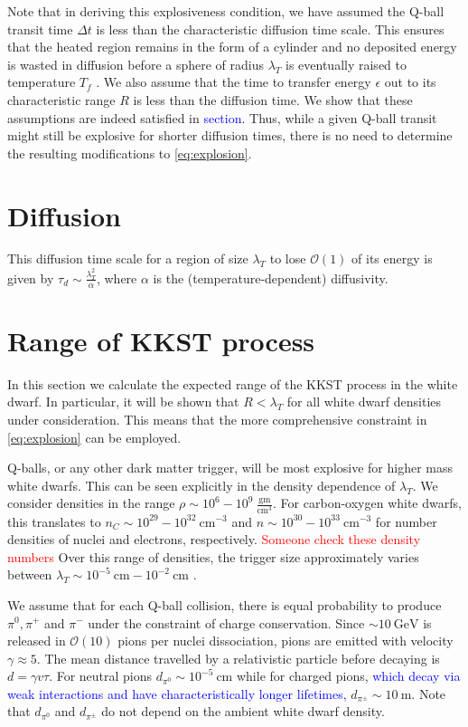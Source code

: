 \documentclass[11 pt, preprint,preprintnumbers,amsmath,amssymb, prd]{revtex4}
\newcommand{\OO}{\mathcal{O}}
\begin{document}
Note that in deriving this explosiveness condition, we have assumed the Q-ball transit time $\Delta t$ is less than the characteristic diffusion time scale. This ensures that the heated region remains in the form of a cylinder and no deposited energy is wasted in diffusion before a sphere of radius $\lambda_T$ is eventually raised to temperature $T_f$ . We also assume that the time to transfer energy $\epsilon$ out to its characteristic range $R$ is less than the diffusion time. We show that these assumptions are indeed satisfied in \textcolor{blue}{section}. Thus, while a given Q-ball transit might still be explosive for shorter diffusion times, there is no need to determine the resulting modifications to \eqref{eq:explosion}. 

\section{Diffusion}
This diffusion time scale for a region of size $\lambda_T$ to lose $\OO(1)$ of its energy is given by $\tau_d \sim \frac{\lambda_T^2}{\alpha}$, where $\alpha$ is the (temperature-dependent) diffusivity. 

\section{Range of KKST process}

In this section we calculate the expected range of the KKST process in the white dwarf. In particular, it will be shown that $R < \lambda_T$ for all white dwarf densities under consideration. This means that the more comprehensive constraint in \eqref{eq:explosion} can be employed. 

Q-balls, or any other dark matter trigger, will be most explosive for higher mass white dwarfs. This can be seen explicitly in the density dependence of $\lambda_T$. We consider densities in the range $\rho \sim 10^{6} - 10^{9} ~\frac{\text{gm}}{\text{cm}^3}$. For carbon-oxygen white dwarfs, this translates to $n_C \sim 10^{29} - 10^{32} ~\text{cm}^{-3}$ and $n \sim 10^{30} - 10^{33} ~\text{cm}^{-3}$ for number densities of nuclei and electrons, respectively. \textcolor{red}{Someone check these density numbers} Over this range of densities, the trigger size approximately varies between $\lambda_T \sim 10^{-5} ~\text{cm} -10^{-2} ~\text{cm}$ \cite{Varela}. 

We assume that for each Q-ball collision, there is equal probability to produce $\pi^0, \pi^+$ and $\pi^-$ under the constraint of charge conservation. Since $\sim 10 ~\text{GeV}$ is released in $\OO(10)$ pions per nuclei dissociation, pions are emitted with velocity $\gamma \approx 5$. The mean distance travelled by a relativistic particle before decaying is $d = \gamma v \tau$. For neutral pions $d_{\pi^0} \sim 10^{-5} ~\text{cm}$ while for charged pions, \textcolor{blue}{which decay via weak interactions and have characteristically longer lifetimes,} $d_{\pi^\pm} \sim 10 ~\text{m}$. Note that $d_{\pi^0}$ and $d_{\pi^\pm}$ do not depend on the ambient white dwarf density. 
\end{document}

